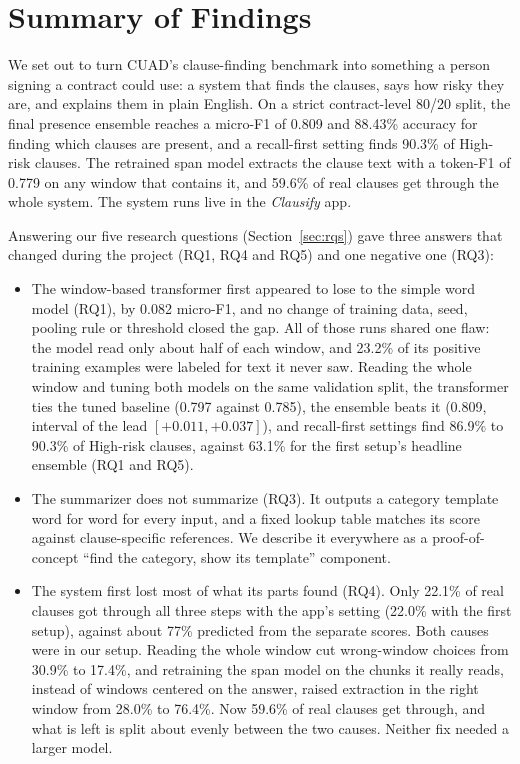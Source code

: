 \section{Summary of Findings}
We set out to turn CUAD's clause-finding benchmark into something a person signing a contract could use: a system that finds the clauses, says how risky they are, and explains them in plain English. On a strict contract-level 80/20 split, the final presence ensemble reaches a micro-F1 of 0.809 and 88.43\% accuracy for finding which clauses are present, and a recall-first setting finds 90.3\% of High-risk clauses. The retrained span model extracts the clause text with a token-F1 of 0.779 on any window that contains it, and 59.6\% of real clauses get through the whole system. The system runs live in the \emph{Clausify} app.

Answering our five research questions (Section~\ref{sec:rqs}) gave three answers that changed during the project (RQ1, RQ4 and RQ5) and one negative one (RQ3):

\begin{itemize}[itemsep=3pt]
  \item The window-based transformer first appeared to lose to the simple word model (RQ1), by 0.082 micro-F1, and no change of training data, seed, pooling rule or threshold closed the gap. All of those runs shared one flaw: the model read only about half of each window, and 23.2\% of its positive training examples were labeled for text it never saw. Reading the whole window and tuning both models on the same validation split, the transformer ties the tuned baseline (0.797 against 0.785), the ensemble beats it (0.809, interval of the lead $[+0.011, +0.037]$), and recall-first settings find 86.9\% to 90.3\% of High-risk clauses, against 63.1\% for the first setup's headline ensemble (RQ1 and RQ5).
  \item The summarizer does not summarize (RQ3). It outputs a category template word for word for every input, and a fixed lookup table matches its score against clause-specific references. We describe it everywhere as a proof-of-concept ``find the category, show its template'' component.
  \item The system first lost most of what its parts found (RQ4). Only 22.1\% of real clauses got through all three steps with the app's setting (22.0\% with the first setup), against about 77\% predicted from the separate scores. Both causes were in our setup. Reading the whole window cut wrong-window choices from 30.9\% to 17.4\%, and retraining the span model on the chunks it really reads, instead of windows centered on the answer, raised extraction in the right window from 28.0\% to 76.4\%. Now 59.6\% of real clauses get through, and what is left is split about evenly between the two causes. Neither fix needed a larger model.
\end{itemize}

